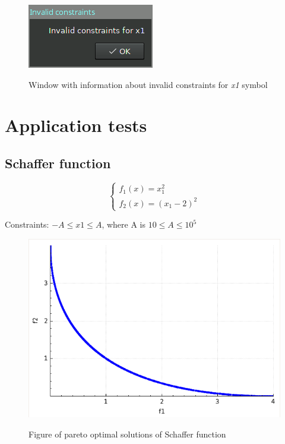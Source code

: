 \documentclass[a4paper, 11pt]{article}
\begin{document}
	\begin{figure}[H]
	\centering
	\includegraphics[scale=0.8]{constraints.png}
	\label{fig:constraints}
	\caption{Window with information about invalid constraints for \textit{x1} symbol}
	\end{figure}	
	
	\newpage
	\section{Application tests}

	\subsection{Schaffer function}
	$$\begin{cases}
		f_{1}(x)=x_{1}^{2}\\
		f_{2}(x)=(x_{1}-2)^{2}
	\end{cases}$$
		
	Constraints: $-A \leq x1 \leq A$, where A is $10 \leq A \leq 10^{5}$
		
	\begin{figure}[H]
	\centering
	\includegraphics[scale=0.4]{schaffer}
	\label{fig:schaffer}
	\caption{Figure of pareto optimal solutions of Schaffer function}
	\end{figure}
	
\end{document}
